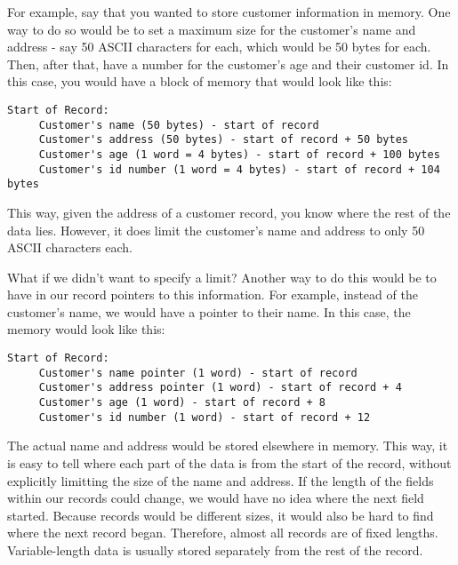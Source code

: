 For example, say that you wanted to store customer information in memory.
One way to do so would be to set a maximum size for the customer's name 
and address - say 50 ASCII characters for each, which would be 50 bytes for each.
Then, after that, have a number for the customer's age and their customer
id.  In this case, you would have a block of memory that would look like
this:

\begin{simpletyping}
\begin{lstlisting}
Start of Record:
     Customer's name (50 bytes) - start of record
     Customer's address (50 bytes) - start of record + 50 bytes
     Customer's age (1 word = 4 bytes) - start of record + 100 bytes
     Customer's id number (1 word = 4 bytes) - start of record + 104 bytes
\end{lstlisting}
\end{simpletyping}

This way, given the address of a customer record, you know where the rest
of the data lies.  However, it does limit the customer's name and address
to only 50 ASCII characters each.

What if we didn't want to specify a limit?
Another way to do this would be to have in our record pointers to this
information.  For example, instead of the customer's name, we would have
a pointer to their name.  In this case, the memory would look like this:

\begin{simpletyping}
\begin{lstlisting}
Start of Record:
     Customer's name pointer (1 word) - start of record
     Customer's address pointer (1 word) - start of record + 4
     Customer's age (1 word) - start of record + 8
     Customer's id number (1 word) - start of record + 12
\end{lstlisting}
\end{simpletyping}

The actual name and address would be stored elsewhere in memory.  This
way, it is easy to tell where each part of the data is from the start
of the record, without explicitly limitting the size of the name and
address.  If the length of the fields within our records could change,
we would have no idea where the next field started.  Because records
would be different sizes, it would also be hard to find where the
next record began.  Therefore, almost all records are of fixed lengths.
Variable-length data is usually stored separately from the rest of the
record.

